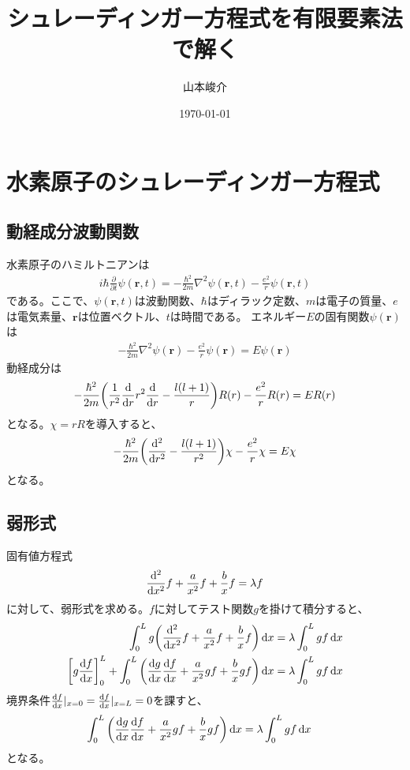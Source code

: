 \documentclass[xelatex,ja=standard]{bxjsarticle}
\title{シュレーディンガー方程式を有限要素法で解く}
\author{山本峻介}
\date{\today}
\begin{document}
\maketitle

\section{水素原子のシュレーディンガー方程式}
\subsection{動経成分波動関数}
水素原子のハミルトニアンは
\begin{align}
    i\hbar\frac{\partial}{\partial t}\psi(\bm{r},t) = -\frac{\hbar^2}{2m}\nabla^2\psi(\bm{r},t) -\frac{e^2}{r}\psi(\bm{r},t)
\end{align}
である。ここで、$\psi(\bm{r},t)$は波動関数、$\hbar$はディラック定数、$m$は電子の質量、$e$は電気素量、$\bm{r}$は位置ベクトル、$t$は時間である。
エネルギー$E$の固有関数$\psi(\bm{r})$は
\begin{align}
    -\frac{\hbar^2}{2m}\nabla^2\psi(\bm{r}) -\frac{e^2}{r}\psi(\bm{r}) = E\psi(\bm{r})
\end{align}
動経成分は
\begin{align}
    -\frac{\hbar^2}{2m}\qty(\frac{1}{r^2}\dv{r}r^2\dv{r} - \frac{l(l+1)}{r})R(r)
     - \frac{e^2}{r}R(r) = ER(r)
\end{align}
となる。$\chi = rR$を導入すると、
\begin{align}
    -\frac{\hbar^2}{2m}\qty(\dv[2]{r} - \frac{l(l+1)}{r^2})\chi - \frac{e^2}{r}\chi = E\chi
\end{align}
となる。

\subsection{弱形式}
固有値方程式
\begin{align}
    \dv[2]{x}f + \frac{a}{x^2}f + \frac{b}{x}f = \lambda f 
\end{align}
に対して、弱形式を求める。$f$に対してテスト関数$g$を掛けて積分すると、
\begin{align}
    \int_0^Lg\qty(\dv[2]{x}f + \frac{a}{x^2}f + \frac{b}{x}f)\dd{x} &= \lambda\int_0^Lgf\dd{x}\notag\\
    \qty[g\dv{f}{x}]_0^L+\int_0^L\qty(\dv{g}{x}\dv{f}{x} + \frac{a}{x^2}gf + \frac{b}{x}gf)\dd{x}
     &= \lambda\int_0^Lgf\dd{x}
\end{align}
境界条件$\dv{f}{x}|_{x=0} = \dv{f}{x}|_{x=L} = 0$を課すと、
\begin{align}
    \int_0^L\qty(\dv{g}{x}\dv{f}{x} + \frac{a}{x^2}gf + \frac{b}{x}gf)\dd{x}
     &= \lambda\int_0^Lgf\dd{x}\label{eq:weak}
\end{align}
となる。
\end{document}
